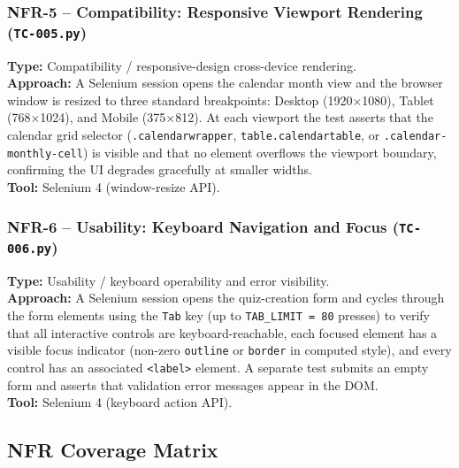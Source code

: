 \documentclass[twoside,final]{hcmut-report}
\begin{document}
\subsubsection{NFR-5 -- Compatibility: Responsive Viewport Rendering (\texttt{TC-005.py})}
\textbf{Type:} Compatibility / responsive-design cross-device rendering.\\
\textbf{Approach:} A Selenium session opens the calendar month view and the browser window is resized to three standard breakpoints: Desktop (1920$\times$1080), Tablet (768$\times$1024), and Mobile (375$\times$812). At each viewport the test asserts that the calendar grid selector (\texttt{.calendarwrapper}, \texttt{table.calendartable}, or \texttt{.calendar-monthly-cell}) is visible and that no element overflows the viewport boundary, confirming the UI degrades gracefully at smaller widths.\\
\textbf{Tool:} Selenium 4 (window-resize API).

\subsubsection{NFR-6 -- Usability: Keyboard Navigation and Focus (\texttt{TC-006.py})}
\textbf{Type:} Usability / keyboard operability and error visibility.\\
\textbf{Approach:} A Selenium session opens the quiz-creation form and cycles through the form elements using the \texttt{Tab} key (up to \texttt{TAB\_LIMIT~=~80} presses) to verify that all interactive controls are keyboard-reachable, each focused element has a visible focus indicator (non-zero \texttt{outline} or \texttt{border} in computed style), and every control has an associated \texttt{<label>} element. A separate test submits an empty form and asserts that validation error messages appear in the DOM.\\
\textbf{Tool:} Selenium 4 (keyboard action API).

\subsection{NFR Coverage Matrix}
\end{document}
